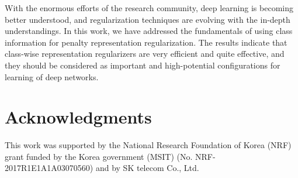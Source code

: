 With the enormous efforts of the research community, deep learning is becoming better understood, and regularization techniques are evolving with the in-depth understandings. In this work, we have addressed the fundamentals of using class information for penalty representation regularization. The results indicate that class-wise representation regularizers are very efficient and quite effective, and they should be considered as important and high-potential configurations for learning of deep networks.

\section*{Acknowledgments}
This work was supported by the National Research Foundation of Korea (NRF) grant funded by the Korea government (MSIT) (No. NRF-2017R1E1A1A03070560) and by SK telecom Co., Ltd.




\clearpage  %



